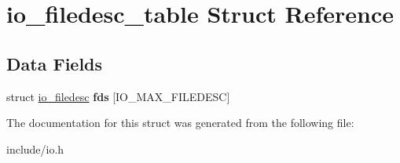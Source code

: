 \hypertarget{structio__filedesc__table}{}\section{io\+\_\+filedesc\+\_\+table Struct Reference}
\label{structio__filedesc__table}
\subsection*{Data Fields}
\begin{DoxyCompactItemize}
\item 
\mbox{\label{structio__filedesc__table_aadc2264614456ac3e58b1708d49996da}} 
struct \mbox{\hyperlink{structio__filedesc}{io\+\_\+filedesc}} {\bfseries fds} \mbox{[}I\+O\+\_\+\+M\+A\+X\+\_\+\+F\+I\+L\+E\+D\+E\+SC\mbox{]}
\end{DoxyCompactItemize}


The documentation for this struct was generated from the following file\+:\begin{DoxyCompactItemize}
\item 
include/io.\+h\end{DoxyCompactItemize}
